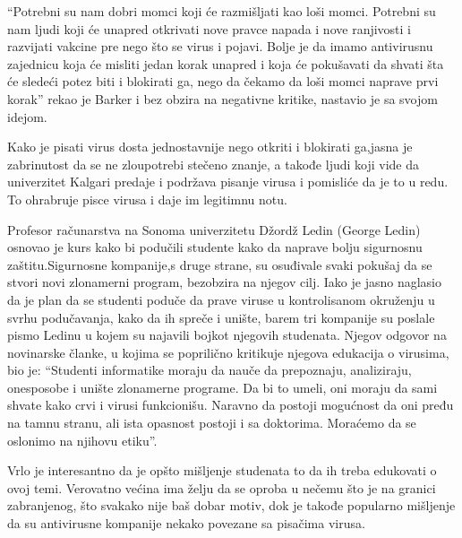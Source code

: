 \documentclass[a4paper]{article}
\begin{document}
``Potrebni su nam dobri momci koji će razmišljati kao loši momci. Potrebni su nam ljudi koji će unapred otkrivati nove pravce napada i nove ranjivosti i razvijati vakcine pre nego što se virus i pojavi.
Bolje je da imamo antivirusnu zajednicu koja će misliti jedan korak unapred i koja će pokušavati da shvati šta će sledeći potez biti i blokirati ga, nego da čekamo da loši momci naprave prvi korak''
rekao je Barker i bez obzira na negativne kritike, nastavio je sa svojom idejom.

Kako je pisati virus dosta jednostavnije nego otkriti i blokirati ga,jasna je zabrinutost da se ne zloupotrebi stečeno znanje, a takođe ljudi koji vide da univerzitet Kalgari predaje i podržava pisanje virusa i pomisliće da je to u redu. 
To ohrabruje pisce virusa i daje im legitimnu notu.

Profesor računarstva na Sonoma univerzitetu Džordž Ledin (George Ledin) osnovao je kurs kako bi podučili studente kako da naprave bolju sigurnosnu zaštitu.Sigurnosne kompanije,s druge strane, su osuđivale
svaki pokušaj da se stvori novi zlonamerni program, bezobzira na njegov cilj. Iako je jasno naglasio da je plan da se studenti poduče da prave viruse u kontrolisanom okruženju u svrhu podučavanja, kako da
ih spreče i unište, barem tri kompanije su poslale pismo Ledinu u kojem su najavili bojkot njegovih studenata.
Njegov odgovor na novinarske članke, u kojima se poprilično kritikuje njegova edukacija o virusima, bio je: ``Studenti informatike moraju da nauče da prepoznaju, analiziraju, onesposobe i unište zlonamerne programe.
Da bi to umeli, oni moraju da sami shvate kako crvi i virusi funkcionišu. Naravno da postoji mogućnost da oni pređu na tamnu stranu, ali ista opasnost postoji i sa doktorima. Moraćemo da se oslonimo na njihovu etiku''.


Vrlo je interesantno da je opšto mišljenje studenata to da ih treba edukovati o ovoj temi. Verovatno većina ima želju da se oproba u nečemu što je na granici zabranjenog, što svakako nije baš dobar motiv,
dok je takođe popularno mišljenje da su antivirusne kompanije nekako povezane sa pisačima virusa.
\end{document}
